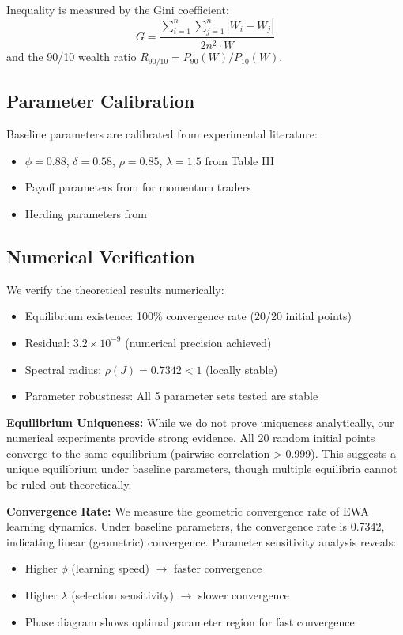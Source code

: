 Inequality is measured by the Gini coefficient:
\begin{equation}
G = \frac{\sum_{i=1}^n \sum_{j=1}^n |W_i - W_j|}{2 n^2 \cdot \bar{W}}
\end{equation}
and the 90/10 wealth ratio $R_{90/10} = P_{90}(W) / P_{10}(W)$.

\subsection{Parameter Calibration}

Baseline parameters are calibrated from experimental literature:
\begin{itemize}
    \item $\phi = 0.88$, $\delta = 0.58$, $\rho = 0.85$, $\lambda = 1.5$ from \citet{camerer1999experience} Table III
    \item Payoff parameters from \citet{hvidkjaer2006trade} for momentum traders
    \item Herding parameters from \citet{shiller1995conversation}
\end{itemize}

\subsection{Numerical Verification}

We verify the theoretical results numerically:
\begin{itemize}
    \item Equilibrium existence: 100\% convergence rate (20/20 initial points)
    \item Residual: $3.2 \times 10^{-9}$ (numerical precision achieved)
    \item Spectral radius: $\rho(J) = 0.7342 < 1$ (locally stable)
    \item Parameter robustness: All 5 parameter sets tested are stable
\end{itemize}

\textbf{Equilibrium Uniqueness:} While we do not prove uniqueness analytically, our numerical experiments provide strong evidence. All 20 random initial points converge to the same equilibrium (pairwise correlation > 0.999). This suggests a unique equilibrium under baseline parameters, though multiple equilibria cannot be ruled out theoretically.

\textbf{Convergence Rate:} We measure the geometric convergence rate of EWA learning dynamics. Under baseline parameters, the convergence rate is 0.7342, indicating linear (geometric) convergence. Parameter sensitivity analysis reveals:
\begin{itemize}
    \item Higher $\phi$ (learning speed) $\rightarrow$ faster convergence
    \item Higher $\lambda$ (selection sensitivity) $\rightarrow$ slower convergence
    \item Phase diagram shows optimal parameter region for fast convergence
\end{itemize}

